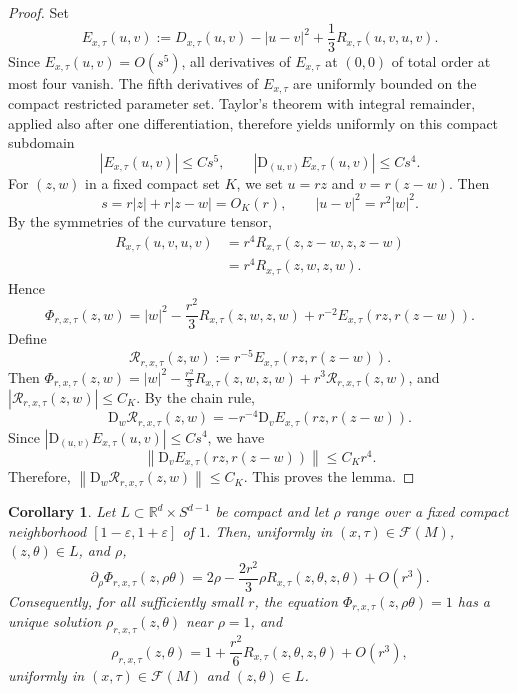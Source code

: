 \documentclass[11pt]{article}
\newtheorem{corollary}[theorem]{Corollary}
\theoremstyle{remark}
\numberwithin{equation}{section}
\begin{document}
\begin{proof}
Set
\[
E_{x,\tau}(u,v)
:=
D_{x,\tau}(u,v)-|u-v|^2
+\frac13R_{x,\tau}(u,v,u,v).
\]
Since $E_{x,\tau}(u,v)=O(s^5)$, all derivatives of
$E_{x,\tau}$ at $(0,0)$ of total order at most four vanish.
The fifth derivatives of $E_{x,\tau}$ are uniformly bounded on the
compact restricted parameter set.  Taylor's theorem with integral
remainder, applied also after one differentiation, therefore yields
uniformly on this compact subdomain
\[
|E_{x,\tau}(u,v)|\le Cs^5,
\qquad
|\mathrm D_{(u,v)}E_{x,\tau}(u,v)|\le Cs^4.
\]
For $(z,w)$ in a fixed compact set $K$, we set
$u=rz$ and $v=r(z-w)$.
Then
\[
s=r|z|+r|z-w|=O_K(r),
\qquad
|u-v|^2=r^2|w|^2.
\]
By the symmetries of the curvature tensor,
\[
\begin{aligned}
R_{x,\tau}(u,v,u,v)
&=
r^4R_{x,\tau}(z,z-w,z,z-w)\\
&=
r^4R_{x,\tau}(z,w,z,w).
\end{aligned}
\]
Hence
\[
\Phi_{r,x,\tau}(z,w)
=
|w|^2
-\frac{r^2}{3}R_{x,\tau}(z,w,z,w)
+r^{-2}E_{x,\tau}(rz,r(z-w)).
\]
Define
\[
\mathcal R_{r,x,\tau}(z,w)
:=
r^{-5}E_{x,\tau}(rz,r(z-w)).
\]
Then
$\Phi_{r,x,\tau}(z,w)
=
|w|^2
-\frac{r^2}{3}R_{x,\tau}(z,w,z,w)
+r^3\mathcal R_{r,x,\tau}(z,w)$,
and
$|\mathcal R_{r,x,\tau}(z,w)|\le C_K$.
By the chain rule,
\[
\mathrm D_w\mathcal R_{r,x,\tau}(z,w)
=
-r^{-4}
\mathrm D_vE_{x,\tau}(rz,r(z-w)).
\]
Since
$|\mathrm D_{(u,v)}E_{x,\tau}(u,v)|\le Cs^4$,
we have
\[
\left\|
\mathrm D_vE_{x,\tau}(rz,r(z-w))
\right\|
\le C_Kr^4.
\]
Therefore,
$\left\|
\mathrm D_w\mathcal R_{r,x,\tau}(z,w)
\right\|
\le C_K$.
This proves the lemma.
\end{proof}

\begin{corollary}
\label{cor:radial-chord-boundary}
Let $L\subset\mathbb R^d\times S^{d-1}$ be compact and let $\rho$ range over a fixed compact neighborhood
$[1-\varepsilon,1+\varepsilon]$ of $1$. Then, uniformly in
$(x,\tau)\in\mathcal F(M)$, $(z,\theta)\in L$, and $\rho$,
\[
\partial_\rho\Phi_{r,x,\tau}(z,\rho\theta)
=
2\rho
-\frac{2r^2}{3}\rho
R_{x,\tau}(z,\theta,z,\theta)
+O(r^3).
\]
Consequently, for all sufficiently small $r$, the equation
$\Phi_{r,x,\tau}(z,\rho\theta)=1$
has a unique solution $\rho_{r,x,\tau}(z,\theta)$ near $\rho=1$, and
\[
\rho_{r,x,\tau}(z,\theta)
=
1+\frac{r^2}{6}
R_{x,\tau}(z,\theta,z,\theta)
+O(r^3),
\]
uniformly in $(x,\tau)\in\mathcal F(M)$ and $(z,\theta)\in L$.
\end{corollary}
\end{document}
